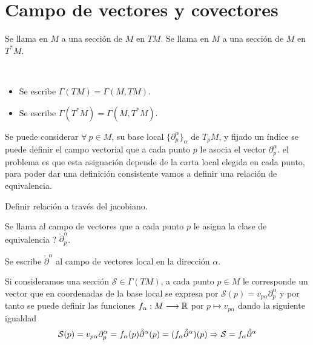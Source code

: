 \section{Campo de vectores y covectores}\label{sec:campo-vectores-covectores}
\begin{definition}
  Se llama  en $M$ a una sección de $M$ en $TM$.
  Se llama  en $M$ a una sección de $M$ en $T^* M$.
\end{definition}

\begin{notation}
  \
  \begin{itemize}
    \item Se escribe $\Gamma(TM) = \Gamma(M, TM)$.
    \item Se escribe $\Gamma(T^*M) = \Gamma(M, T^*M)$.
  \end{itemize}
\end{notation}

Se puede considerar $\forall\ p\in M$, su base local $\{\partial_p^\alpha\}_\alpha$ de $T_p M$, y fijado un índice
se puede definir el campo vectorial que a cada punto $p$ le asocia el vector $\partial_p^\alpha$. el problema es que
esta asignación depende de la carta local elegida en cada punto, para poder dar una definición consistente vamos a
definir una relación de equivalencia.

\begin{exercise}
  Definir relación a través del jacobiano.
\end{exercise}

\begin{definition}
  Se llama  al campo de
  vectores que a cada punto $p$ le asigna la clase de equivalencia ? $\mathring{\partial}_p^\alpha$.
\end{definition}
\begin{notation}
  Se escribe $\mathring{\partial}^\alpha$ al campo de vectores local en la dirección $\alpha$.
\end{notation}

Si consideramos una sección $\mathcal{S}\in\Gamma(TM)$, a cada punto $p\in M$ le corresponde un vector que en
coordenadas de la base local se expresa por $\mathcal{S}(p)=v_{p\alpha}\partial_p^\alpha$ y por tanto se puede definir
las funciones $f_\alpha:M\longrightarrow \mathbb{R}$ por $p\mapsto v_{p\alpha}$ dando la siguiente igualdad
\begin{equation}\label{eq:seccion-coordenadas-locales}
\mathcal{S}(p)=v_{p\alpha}\partial_p^\alpha=f_\alpha(p)\mathring{\partial}^\alpha(p)=(f_\alpha\mathring{\partial}^\alpha)(p)
  \Rightarrow
\mathcal{S}=f_\alpha\mathring{\partial}^\alpha
\end{equation}

